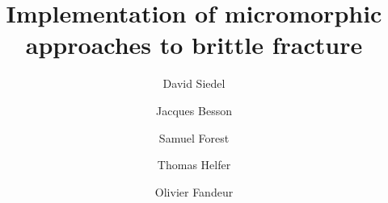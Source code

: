 \documentclass[3p,times,fleqn]{elsarticle}
\begin{document}

\begin{frontmatter}



\dochead{}

  \title{Implementation of micromorphic approaches to brittle fracture}


\author[lsc]{David Siedel}
\author[psl]{Jacques Besson}
\author[psl]{Samuel Forest}
\author[lsc]{Thomas Helfer}
\author[lm2s,imsia]{Olivier Fandeur}

\address[lsc]{CEA, DES/IRESNE/DEC/SESC/LSC, Département d'Études des Combustibles, Cadarache, France}
\address[psl]{MINES ParisTech, PSL Research University, MAT - Centre des matériaux, CNRS UMR 7633, Evry BP 87 9103, France}
\address[lm2s]{CEA, ISAS/DES/DM2S/SEMT/LM2S, Département de Modélisation des Systèmes et des Structures, Saclay, France}
\address[imsia]{IMSIA, UMR 8193, CNRS-EDF-CEA-ENSTA}
\address[edf]{EDF R\&D ERMES, 7 Boulevard Gaspard Monge, 91120 Palaiseau, France}

\address{}


\end{frontmatter}
\end{document}
